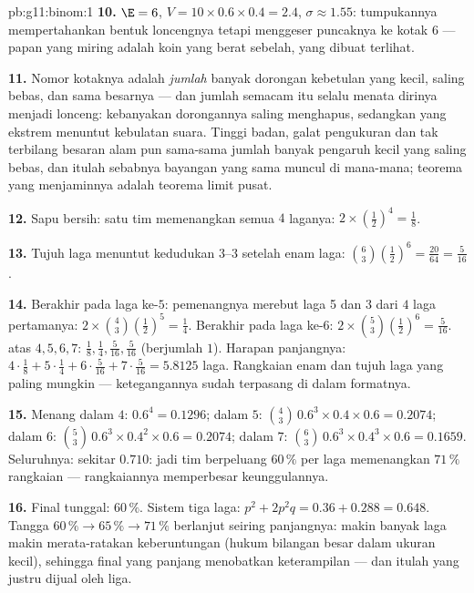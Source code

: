 \begin{solution}{pb:g11:binom:1}
\textbf{10.} $\E = 6$, $V = 10 \times 0.6 \times 0.4 = 2.4$,
$\sigma \approx 1.55$: tumpukannya mempertahankan bentuk loncengnya tetapi
menggeser puncaknya ke kotak $6$ --- papan yang miring adalah koin yang
berat sebelah, yang dibuat terlihat.

\textbf{11.} Nomor kotaknya adalah \emph{jumlah} banyak dorongan
kebetulan yang kecil, saling bebas, dan sama besarnya --- dan jumlah semacam
itu selalu menata dirinya menjadi lonceng: kebanyakan dorongannya saling
menghapus, sedangkan yang ekstrem menuntut kebulatan suara. Tinggi badan,
galat pengukuran dan tak terbilang besaran alam pun sama-sama jumlah banyak
pengaruh kecil yang saling bebas, dan itulah sebabnya bayangan yang sama
muncul di mana-mana; teorema yang menjaminnya adalah teorema limit pusat.

\textbf{12.} Sapu bersih: satu tim memenangkan semua $4$ laganya:
$2 \times \left(\frac12\right)^4 = \frac18$.

\textbf{13.} Tujuh laga menuntut kedudukan $3$--$3$ setelah enam laga:
$\binom63 \left(\frac12\right)^6 = \frac{20}{64} =
\frac{5}{16}$.

\textbf{14.} Berakhir pada laga ke-$5$: pemenangnya merebut laga 5 dan $3$
dari $4$ laga pertamanya:
$2 \times \binom43 \left(\frac12\right)^5 = \frac14$. Berakhir pada laga
ke-$6$: $2 \times \binom53 \left(\frac12\right)^6 = \frac{5}{16}$.
 atas $4, 5, 6, 7$:
$\frac18, \frac14, \frac{5}{16}, \frac{5}{16}$ (berjumlah $1$).
Harapan panjangnya: $4 \cdot \frac18 + 5 \cdot \frac14 + 6 \cdot
\frac{5}{16} + 7 \cdot \frac{5}{16} = 5.8125$ laga. Rangkaian enam dan
tujuh laga yang paling mungkin --- ketegangannya sudah terpasang di dalam
formatnya.

\textbf{15.} Menang dalam $4$: $0.6^4 = 0.1296$; dalam $5$:
$\binom43\,0.6^3 \times 0.4 \times 0.6 = 0.2074$; dalam $6$:
$\binom53\,0.6^3 \times 0.4^2 \times 0.6 = 0.2074$; dalam $7$:
$\binom63\,0.6^3 \times 0.4^3 \times 0.6 = 0.1659$. Seluruhnya:
sekitar $0.710$: jadi tim berpeluang $60\,\%$ per laga memenangkan
$71\,\%$ rangkaian --- rangkaiannya memperbesar keunggulannya.

\textbf{16.} Final tunggal: $60\,\%$. Sistem tiga laga:
$p^2 + 2p^2 q = 0.36 + 0.288 = 0.648$. Tangga
$60\,\% \to 65\,\% \to 71\,\%$ berlanjut seiring panjangnya: makin banyak
laga makin merata-ratakan keberuntungan (hukum bilangan besar dalam ukuran
kecil), sehingga final yang panjang menobatkan keterampilan --- dan itulah
yang justru dijual oleh liga.


\end{solution}
